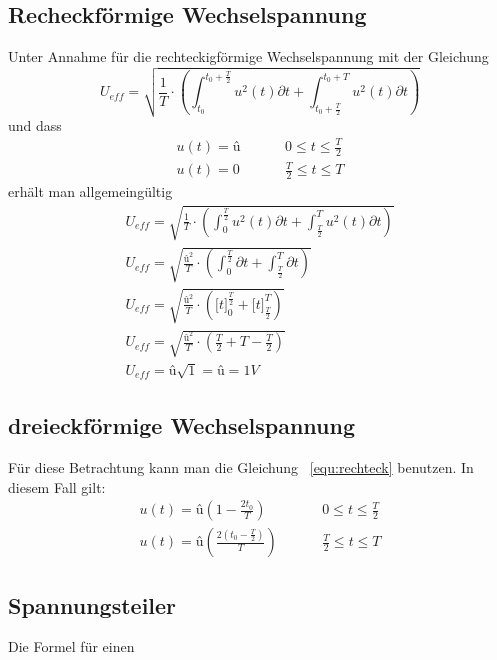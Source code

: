         \subsection{Recheckförmige Wechselspannung}
            Unter Annahme für die rechteckigförmige Wechselspannung mit der Gleichung
            \begin{equation}\label{equ:rechteck}
                U_{eff}=\sqrt{\frac{1}{T}\cdot\left(\int_{t_0}^{t_0+\frac{T}{2}} u^2(t)\partial t + \int_{t_0+\frac{T}{2}}^{t_0+T} u^2(t)\partial t\right)}
            \end{equation} 
            und dass 
            \begin{align}
                u(t)=û  &\hspace{1cm}0 \leq t \leq \frac{T}{2}\\
                u(t)=0 &\hspace{1cm} \frac{T}{2} \leq t \leq T
            \end{align}    
            erhält man allgemeingültig 
            \begin{gather}
                U_{eff}=\sqrt{\frac{1}{T}\cdot\left(\int_{0}^{\frac{T}{2}} u^2(t)\partial t + \int_{\frac{T}{2}}^{T} u^2(t)\partial t\right)}    \\
                U_{eff}=\sqrt{\frac{û^2}{T}\cdot\left(\int_{0}^{\frac{T}{2}} \partial t + \int_{\frac{T}{2}}^{T}\partial t\right)}    \\
                U_{eff}=\sqrt{\frac{û^2}{T}\cdot\left(\big[t\big]_{0}^{\frac{T}{2}} + \big[t\big]_{\frac{T}{2}}^{T}\right)} \\  
                U_{eff}=\sqrt{\frac{û^2}{T}\cdot\left(\frac{T}{2}+T-\frac{T}{2}\right)} \\
                U_{eff}=û\sqrt{1} = û = 1V
            \end{gather}
        \subsection{dreieckförmige Wechselspannung}   
            Für diese Betrachtung kann man die Gleichung ~\ref{equ:rechteck} benutzen.
            In diesem Fall gilt:
            \begin{align}
                u(t)=û(1-\frac{2t_0}{T})  &\hspace{1cm}0 \leq t \leq \frac{T}{2}\\
                u(t)=û(\frac{2(t_0-\frac{T}{2})}{T}) &\hspace{1cm} \frac{T}{2} \leq t \leq T
            \end{align}
        \subsection{Spannungsteiler}
            Die Formel für einen 

        


            
